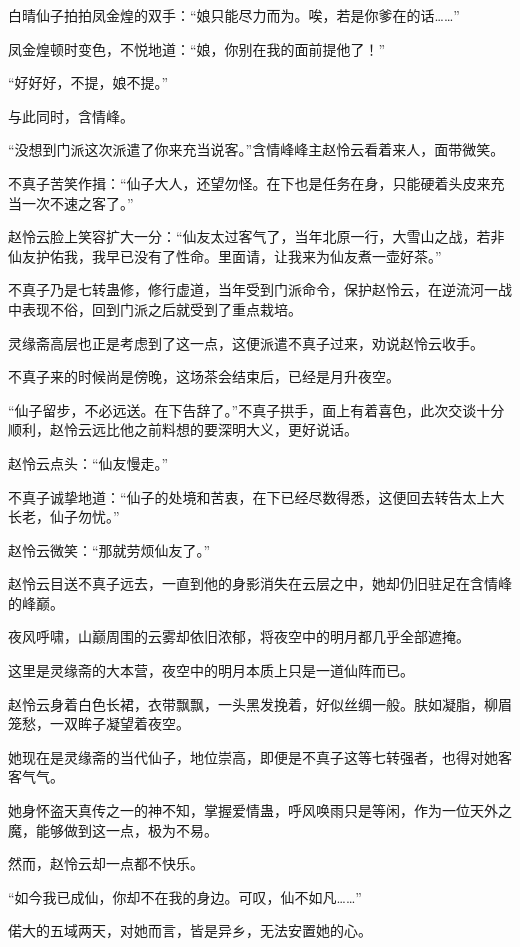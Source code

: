 \begin{this_body}
白晴仙子拍拍凤金煌的双手：“娘只能尽力而为。唉，若是你爹在的话……”

凤金煌顿时变色，不悦地道：“娘，你别在我的面前提他了！”

“好好好，不提，娘不提。”

与此同时，含情峰。

“没想到门派这次派遣了你来充当说客。”含情峰峰主赵怜云看着来人，面带微笑。

不真子苦笑作揖：“仙子大人，还望勿怪。在下也是任务在身，只能硬着头皮来充当一次不速之客了。”

赵怜云脸上笑容扩大一分：“仙友太过客气了，当年北原一行，大雪山之战，若非仙友护佑我，我早已没有了性命。里面请，让我来为仙友煮一壶好茶。”

不真子乃是七转蛊修，修行虚道，当年受到门派命令，保护赵怜云，在逆流河一战中表现不俗，回到门派之后就受到了重点栽培。

灵缘斋高层也正是考虑到了这一点，这便派遣不真子过来，劝说赵怜云收手。

不真子来的时候尚是傍晚，这场茶会结束后，已经是月升夜空。

“仙子留步，不必远送。在下告辞了。”不真子拱手，面上有着喜色，此次交谈十分顺利，赵怜云远比他之前料想的要深明大义，更好说话。

赵怜云点头：“仙友慢走。”

不真子诚挚地道：“仙子的处境和苦衷，在下已经尽数得悉，这便回去转告太上大长老，仙子勿忧。”

赵怜云微笑：“那就劳烦仙友了。”

赵怜云目送不真子远去，一直到他的身影消失在云层之中，她却仍旧驻足在含情峰的峰巅。

夜风呼啸，山巅周围的云雾却依旧浓郁，将夜空中的明月都几乎全部遮掩。

这里是灵缘斋的大本营，夜空中的明月本质上只是一道仙阵而已。

赵怜云身着白色长裙，衣带飘飘，一头黑发挽着，好似丝绸一般。肤如凝脂，柳眉笼愁，一双眸子凝望着夜空。

她现在是灵缘斋的当代仙子，地位崇高，即便是不真子这等七转强者，也得对她客客气气。

她身怀盗天真传之一的神不知，掌握爱情蛊，呼风唤雨只是等闲，作为一位天外之魔，能够做到这一点，极为不易。

然而，赵怜云却一点都不快乐。

“如今我已成仙，你却不在我的身边。可叹，仙不如凡……”

偌大的五域两天，对她而言，皆是异乡，无法安置她的心。


\end{this_body}
